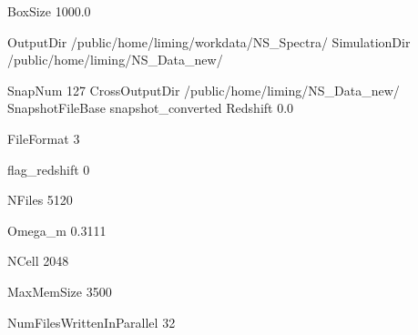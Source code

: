 BoxSize 1000.0

OutputDir     /public/home/liming/workdata/NS_Spectra/
SimulationDir /public/home/liming/NS_Data_new/

SnapNum 127
CrossOutputDir /public/home/liming/NS_Data_new/
SnapshotFileBase snapshot_converted
Redshift 0.0

FileFormat 3

flag_redshift 0 

NFiles  5120

Omega_m 0.3111

NCell   2048 

MaxMemSize  3500 

NumFilesWrittenInParallel 32

